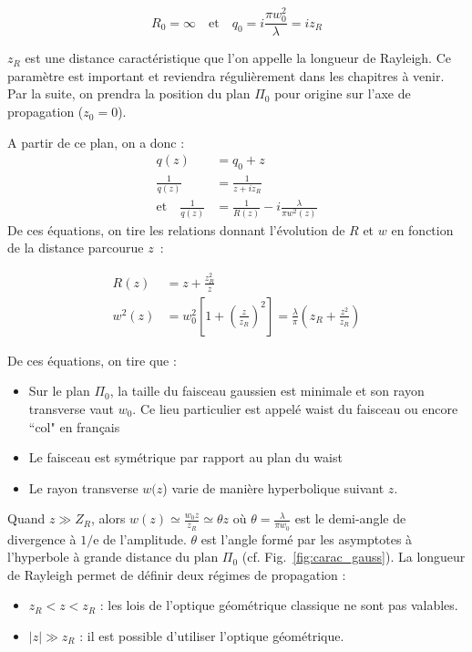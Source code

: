 \documentclass[a4paper]{book}
\begin{document}
\begin{equation}
    R_0 = \infty \quad \textrm{et} \quad q_0=i\frac{\pi w_0^2}{\lambda} = iz_R
\end{equation}

$z_R$ est une distance caractéristique que l'on appelle la longueur de Rayleigh. Ce paramètre est important et reviendra régulièrement dans les chapitres à venir.
Par la suite, on prendra la position du plan $\Pi_0$ pour origine sur l'axe de propagation ($z_0=0$).

A partir de ce plan, on a donc :
\begin{align}
    q(z) &= q_0+z\\
    \frac{1}{q(z)}&=\frac{1}{z+iz_R}\\
    \textrm{et} \quad \frac{1}{q(z)}&=\frac{1}{R(z)}-i\frac{\lambda}{\pi w^2(z)}
\end{align}
De ces équations, on tire les relations donnant l'évolution de $R$ et $w$ en fonction de la distance parcourue $z$~:

\begin{align}
  R(z) &= z + \frac{z_R^2}{z}\\
  w^2(z)&= w_0^2\left[1+\left(\frac{z}{z_R}\right)^2\right]  = \frac{\lambda}{\pi}\left(z_R+\frac{z^2}{z_R}\right)
\end{align}

De ces équations, on tire que :
\begin{itemize}
    \item Sur le plan $\Pi_0$, la taille du faisceau gaussien est minimale et son rayon transverse vaut $w_0$. Ce lieu particulier est appelé waist du faisceau ou encore  ``col" en français
    \item Le faisceau est symétrique par rapport au plan du waist
    \item Le rayon transverse $w(z$) varie de manière hyperbolique suivant $z$.
\end{itemize}

Quand $z\gg Z_R$, alors $w(z)\simeq\frac{w_0z}{z_R}\simeq \theta z$ où $\theta = \frac{\lambda}{\pi w_0}$ est le demi-angle de divergence à $1/$e de
l'amplitude. $\theta$ est l'angle formé par les asymptotes à l'hyperbole à grande
distance du plan $\Pi_0$ (cf. Fig.~\ref{fig:carac_gauss}).
La longueur de Rayleigh permet de définir deux régimes de propagation :
\begin{itemize}
    \item $z_R < z < z_R$ : les lois de l'optique géométrique classique ne sont pas valables.
    \item $|z|\gg z_R$ : il est possible d'utiliser l'optique géométrique.
\end{itemize}
\end{document}
